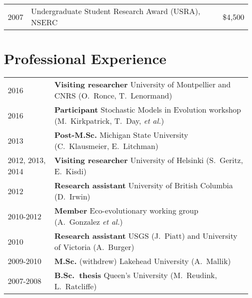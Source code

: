 \documentclass[12pt]{article}
\begin{document}
\begin{tabular}{llr}
  2007 & Undergraduate Student Research Award (USRA), NSERC & \$4,500\\
\end{tabular}

\section*{Professional Experience}

\begin{tabular}{ll}
2016 & \textbf{Visiting researcher} University of Montpellier and CNRS (O.\ Ronce, T.\ Lenormand)\\ 
2016 & \textbf{Participant} Stochastic Models in Evolution workshop (M.\ Kirkpatrick, T.\ Day, \textit{et al.}) \\
2013 &  \textbf{Post-M.Sc.} Michigan State University (C.\ Klausmeier, E.\ Litchman)\\
2012, 2013, 2014 &  \textbf{Visiting researcher} University of Helsinki (S.\ Geritz, E.\ Kisdi)\\ 
2012 &  \textbf{Research assistant} University of British Columbia (D.\ Irwin)\\
2010-2012 &  \textbf{Member} Eco-evolutionary working group (A.\ Gonzalez \textit{et al.})\\
2010 & \textbf{Research assistant} USGS (J.\ Piatt) and University of Victoria (A.\ Burger) \\
2009-2010 & \textbf{M.Sc.} (withdrew) Lakehead University (A.\ Mallik) \\
2007-2008 & \textbf{B.Sc.\ thesis} Queen's University (M.\ Reudink, L.\ Ratcliffe)
\end{tabular}
\end{document}
